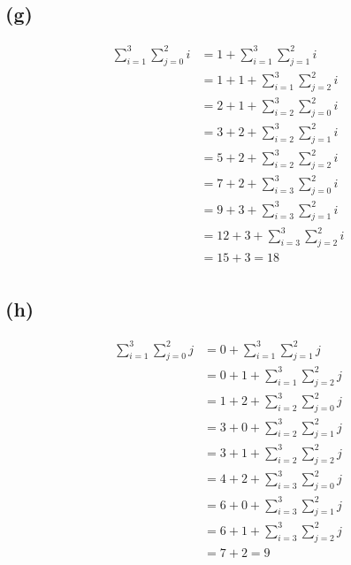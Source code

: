 \documentclass{article}
\begin{document}
\subsection*{(g)}
\begin{equation} \label{eq7}
\begin{split}
\sum\limits_{i=1}^{3}\sum\limits_{j=0}^{2}i & =  1 + \sum\limits_{i=1}^{3}\sum\limits_{j=1}^{2}i \\
& =  1 + 1 + \sum\limits_{i=1}^{3}\sum\limits_{j=2}^{2}i \\
& =  2 + 1 + \sum\limits_{i=2}^{3}\sum\limits_{j=0}^{2}i \\ 
& =  3 + 2 + \sum\limits_{i=2}^{3}\sum\limits_{j=1}^{2}i \\ 
& =  5 + 2 + \sum\limits_{i=2}^{3}\sum\limits_{j=2}^{2}i \\ 
& =  7 + 2 + \sum\limits_{i=3}^{3}\sum\limits_{j=0}^{2}i \\ 
& =  9 + 3 + \sum\limits_{i=3}^{3}\sum\limits_{j=1}^{2}i \\ 
& =  12 + 3 + \sum\limits_{i=3}^{3}\sum\limits_{j=2}^{2}i \\ 
& =  15 + 3 = 18\\ 
\end{split}
\end{equation}

\subsection*{(h)}
\begin{equation} \label{eq8}
\begin{split}
\sum\limits_{i=1}^{3}\sum\limits_{j=0}^{2}j & =  0 + \sum\limits_{i=1}^{3}\sum\limits_{j=1}^{2}j \\
& =  0 + 1 + \sum\limits_{i=1}^{3}\sum\limits_{j=2}^{2}j \\
& =  1 + 2 + \sum\limits_{i=2}^{3}\sum\limits_{j=0}^{2}j \\ 
& =  3 + 0 + \sum\limits_{i=2}^{3}\sum\limits_{j=1}^{2}j \\ 
& =  3 + 1 + \sum\limits_{i=2}^{3}\sum\limits_{j=2}^{2}j \\ 
& =  4 + 2 + \sum\limits_{i=3}^{3}\sum\limits_{j=0}^{2}j \\ 
& =  6 + 0 + \sum\limits_{i=3}^{3}\sum\limits_{j=1}^{2}j \\ 
& =  6 + 1 + \sum\limits_{i=3}^{3}\sum\limits_{j=2}^{2}j \\ 
& =  7 + 2 = 9\\ 
\end{split}
\end{equation}
\end{document}
